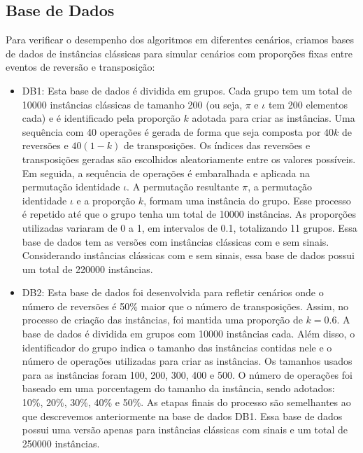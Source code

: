 \subsection{Base de Dados}

Para verificar o desempenho dos algoritmos em diferentes cenários, criamos bases de dados de instâncias clássicas para simular cenários com proporções fixas entre eventos de reversão e transposição:

\begin{itemize}
  \item DB1: Esta base de dados é dividida em grupos. Cada grupo tem um total de 10000 instâncias clássicas de tamanho 200 (ou seja, $\pi$ e $\iota$ tem 200 elementos cada) e é identificado pela proporção $k$ adotada para criar as instâncias. Uma sequência com 40 operações é gerada de forma que seja composta por $40k$ de reversões e $40(1-k)$ de transposições. Os índices das reversões e transposições geradas são escolhidos aleatoriamente entre os valores possíveis. Em seguida, a sequência de operações é embaralhada e aplicada na permutação identidade $\iota$. A permutação resultante $\pi$, a permutação identidade $\iota$ e a proporção $k$, formam uma instância do grupo. Esse processo é repetido até que o grupo tenha um total de 10000 instâncias. As proporções utilizadas variaram de 0 a 1, em intervalos de 0.1, totalizando 11 grupos. Essa base de dados tem as versões com instâncias clássicas com e sem sinais. Considerando instâncias clássicas com e sem sinais, essa base de dados possui um total de 220000 instâncias.

  \item DB2: Esta base de dados foi desenvolvida para refletir cenários onde o número de reversões é 50\% maior que o número de transposições. Assim, no processo de criação das instâncias, foi mantida uma proporção de $k = 0.6$. A base de dados é dividida em grupos com 10000 instâncias cada. Além disso, o identificador do grupo indica o tamanho das instâncias contidas nele e o número de operações utilizadas para criar as instâncias. Os tamanhos usados para as instâncias foram 100, 200, 300, 400 e 500. O número de operações foi baseado em uma porcentagem do tamanho da instância, sendo adotados: 10\%, 20\%, 30\%, 40\% e 50\%. As etapas finais do processo são semelhantes ao que descrevemos anteriormente na base de dados DB1. Essa base de dados possui uma versão apenas para instâncias clássicas com sinais e um total de 250000 instâncias.
\end{itemize}

